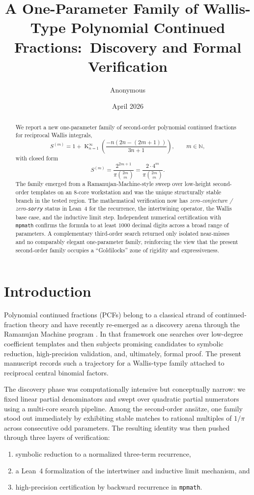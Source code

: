 \documentclass[11pt,reqno]{amsart}
\title[A One-Parameter Family of Wallis-Type PCFs]{A One-Parameter Family of Wallis-Type Polynomial Continued Fractions:\ Discovery and Formal Verification}
\author{Anonymous}
\date{April 2026}
\DeclareMathOperator{\Kop}{K}
\newcommand{\N}{\mathbb{N}}
\theoremstyle{plain}
\theoremstyle{definition}
\theoremstyle{remark}
\begin{document}
\begin{abstract}
We report a new one-parameter family of second-order polynomial continued fractions for reciprocal Wallis integrals,
\[
  S^{(m)} = 1 + \Kop_{n=1}^{\infty}\!\left(\frac{-n(2n-(2m+1))}{3n+1}\right),
  \qquad m \in \N,
\]
with closed form
\[
  S^{(m)} = \frac{2^{2m+1}}{\pi\binom{2m}{m}} = \frac{2\cdot 4^m}{\pi\binom{2m}{m}}.
\]
The family emerged from a Ramanujan-Machine-style sweep over low-height second-order templates on an 8-core workstation and was the unique structurally stable branch in the tested region.  The mathematical verification now has \emph{zero-conjecture / zero-\texttt{sorry}} status in Lean~4 for the recurrence, the intertwining operator, the Wallis base case, and the inductive limit step.  Independent numerical certification with \texttt{mpmath} confirms the formula to at least $1000$ decimal digits across a broad range of parameters.  A complementary third-order search returned only isolated near-misses and no comparably elegant one-parameter family, reinforcing the view that the present second-order family occupies a ``Goldilocks'' zone of rigidity and expressiveness.
\end{abstract}

\maketitle

\section{Introduction}

Polynomial continued fractions (PCFs) belong to a classical strand of continued-fraction theory \cite{wall1948analytic,lorentzen1992continued,cuyt2008handbook} and have recently re-emerged as a discovery arena through the Ramanujan Machine program \cite{raayoni2021}.  In that framework one searches over low-degree coefficient templates and then subjects promising candidates to symbolic reduction, high-precision validation, and, ultimately, formal proof.  The present manuscript records such a trajectory for a Wallis-type family attached to reciprocal central binomial factors.

The discovery phase was computationally intensive but conceptually narrow: we fixed linear partial denominators and swept over quadratic partial numerators using a multi-core search pipeline.  Among the second-order ansätze, one family stood out immediately by exhibiting stable matches to rational multiples of $1/\pi$ across consecutive odd parameters.  The resulting identity was then pushed through three layers of verification:
\begin{enumerate}[label=\textup{(\roman*)}]
  \item symbolic reduction to a normalized three-term recurrence,
  \item a Lean~4 formalization of the intertwiner and inductive limit mechanism, and
  \item high-precision certification by backward recurrence in \texttt{mpmath}.
\end{enumerate}
\end{document}
